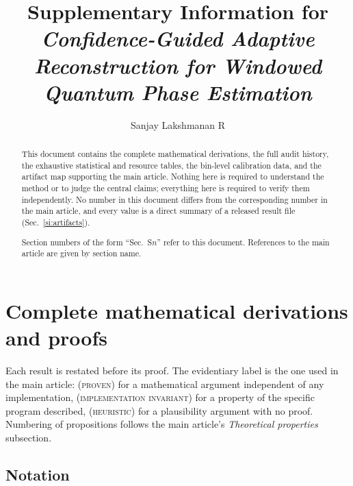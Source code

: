 \documentclass[preprint,11pt]{elsarticle}
\newcommand{\PROVEN}{\textsc{(proven)}}
\newcommand{\HEUR}{\textsc{(heuristic)}}
\newcommand{\INVAR}{\textsc{(implementation invariant)}}
\begin{document}
\begin{frontmatter}
\title{Supplementary Information for\\
\emph{Confidence-Guided Adaptive Reconstruction for Windowed Quantum
Phase Estimation}}
\author[inst1]{Sanjay Lakshmanan R}
\address[inst1]{Department of Computer Science and Engineering,
Amrita Vishwa Vidyapeetham, Chennai, India}

\begin{abstract}
This document contains the complete mathematical derivations, the full
audit history, the exhaustive statistical and resource tables, the
bin-level calibration data, and the artifact map supporting the main
article. Nothing here is required to understand the method or to judge
the central claims; everything here is required to verify them
independently. No number in this document differs from the corresponding
number in the main article, and every value is a direct summary of a
released result file (Sec.~\ref{si:artifacts}).

Section numbers of the form ``Sec.~S$n$'' refer to this document.
References to the main article are given by section name.
\end{abstract}
\end{frontmatter}

\tableofcontents
\vspace{1em}

\section{Complete mathematical derivations and proofs}
\label{si:proofs}

Each result is restated before its proof. The evidentiary label is the
one used in the main article: \PROVEN{} for a mathematical argument
independent of any implementation, \INVAR{} for a property of the
specific program described, \HEUR{} for a plausibility argument with no
proof. Numbering of propositions follows the main article's
\emph{Theoretical properties} subsection.

\subsection{Notation}
\end{document}
